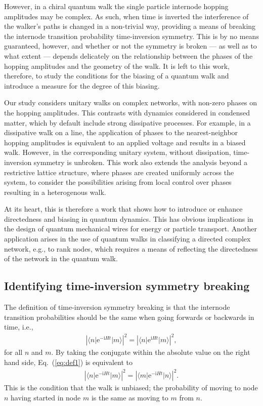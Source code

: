 \documentclass[aps,pra,12pt,nofootinbib,superscriptaddress,longbibliography,showpacs]{revtex4-1}
\theoremstyle{plain}
\theoremstyle{definition}
\newcommand{\bra}[1]{\mbox{$\langle #1|$}}
\newcommand{\ket}[1]{\ensuremath{|#1\rangle}}
\newcommand{\eee}{\mathrm{e}}
\newcommand{\ii}{\mathrm{i}}
\newcommand{\eqr}[1]{Eq.~(\ref{#1})}
\begin{document}
However, in a chiral quantum walk the single particle internode hopping amplitudes may be complex. As such, when time is inverted the interference of the walker's paths is changed in a non-trivial way, providing a means of breaking the internode transition probability time-inversion symmetry. This is by no means guaranteed, however, and whether or not the symmetry is broken --- as well as to what extent --- depends delicately on the relationship between the phases of the hopping amplitudes and the geometry of the walk. It is left to this work, therefore, to study the conditions for the biasing of a quantum walk and introduce a measure for the degree of this biasing. 

Our study considers unitary walks on complex networks, with non-zero phases on the hopping amplitudes. This contrasts with dynamics considered in condensed matter, which by default include strong dissipative processes. For example, in a dissipative walk on a line, the application of phases to the nearest-neighbor hopping amplitudes is equivalent to an applied voltage and results in a biased walk. However, in the corresponding unitary system, without dissipation, time-inversion symmetry is unbroken. This work also extends the analysis beyond a restrictive lattice structure, where phases are created uniformly across the system, to consider the possibilities arising from local control over phases resulting in a heterogenous walk.

At its heart, this is therefore a work that shows how to introduce or enhance directedness and biasing in quantum dynamics. This has obvious implications in the design of quantum mechanical wires for energy or particle transport. Another application arises in the use of quantum walks in classifying a directed complex network, e.g., to rank nodes, which requires a means of reflecting the directedness of the network in the quantum walk.

\subsection{Identifying time-inversion symmetry breaking}
The definition of time-inversion symmetry breaking is that the internode transition probabilities should be the same when going forwards or backwards in time, i.e.,
\begin{align}
\label{eq:def1}
| \bra{n} \eee^{-\ii H t} \ket{m} |^2 = | \bra{n} \eee^{\ii H t} \ket{m} |^2 ,
\end{align}
for all $n$ and $m$. By taking the conjugate within the absolute value on the right hand side, \eqr{eq:def1} is equivalent to
\begin{align}
\label{eq:def2}
| \bra{n} \eee^{-\ii H t} \ket{m} |^2 = | \bra{m} \eee^{-\ii H t} \ket{n} |^2 .
\end{align}
This is the condition that the walk is unbiased; the probability of moving to node $n$ having started in node $m$ is the same as moving to $m$ from $n$.
\end{document}
